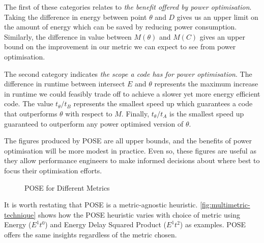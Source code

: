 The first of these categories relates to \textit{the benefit offered by power optimisation}.
Taking the difference in energy between point $\theta$ and $D$ gives us an upper limit on the amount of energy which can be saved by reducing power consumption.
Similarly, the difference in value between $M(\theta)$ and $M(C)$ gives an upper bound on the improvement in our metric we can expect to see from power optimisation.

The second category indicates \textit{the scope a code has for power optimisation}.
The difference in runtime between intersect $E$ and $\theta$ represents the maximum increase in runtime we could feasibly trade off to achieve a slower yet more energy efficient code.
The value $t_\theta / t_B$ represents the smallest speed up which guarantees a code that outperforms $\theta$ with respect to $M$.
Finally, $t_\theta / t_A$ is the smallest speed up guaranteed to outperform any power optimised version of $\theta$.

The figures produced by POSE are all upper bounds, and the benefits of power optimisation will be more modest in practice.
Even so, these figures are useful as they allow performance engineers to make informed decisions about where best to focus their optimisation efforts.

\begin{figure}
\scriptsize
\centering

\caption{POSE for Different Metrics}
\label{fig:multimetric-technique}
\end{figure}

It is worth restating that POSE is a metric-agnostic heuristic. 
\autoref{fig:multimetric-technique} shows how the POSE heuristic varies with choice of metric using Energy ($E^1t^0$) and Energy Delay Squared Product ($E^1t^2$) as examples. 
POSE offers the same insights regardless of the metric chosen.
